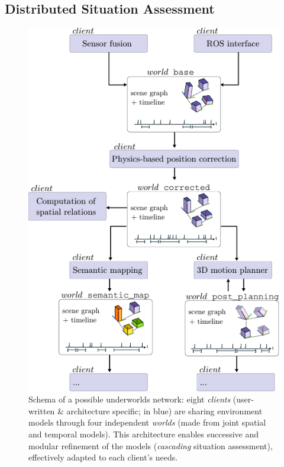 \documentclass[letterpaper, 10pt, conference]{ieeeconf}
\newcommand{\uwds}{{\sc underworlds}\xspace}
\begin{document}
\subsection{Distributed Situation Assessment}

\begin{figure}[ht!]
    \centering
    \includegraphics[width=\linewidth]{overview}
    \caption{Schema of a possible \uwds network: eight \emph{clients} (user-written \&
    architecture specific; in blue) are sharing environment
    models through four independent \emph{worlds} (made from joint spatial and
    temporal models). This architecture enables successive and modular
    refinement of the models (\emph{cascading} situation assessment),
    effectively adapted to each client's needs.}

    \label{fig|scene}

\end{figure}
\end{document}
